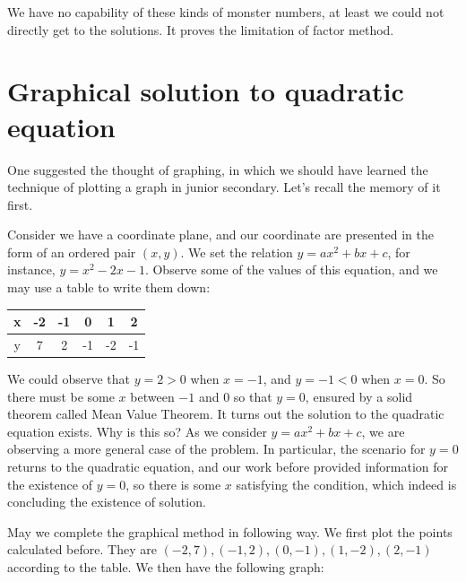 \documentclass[12pt]{article}
\begin{document}
    We have no capability of these kinds of monster numbers, at least we could not directly get to the solutions. It proves the limitation of factor method.

    \section*{Graphical solution to quadratic equation}
    One suggested the thought of graphing, in which we should have learned the technique of plotting a graph in junior secondary. Let's recall the memory of it first.

    Consider we have a coordinate plane, and our coordinate are presented in the form of an ordered pair $(x,y)$. We set the relation $y=ax^2+bx+c$, for instance, $y=x^2-2x-1$. Observe some of the values of this equation, and we may use a table to write them down:
    \begin{center}
        \begin{tabular}{|c||c|c|c|c|c|}
            \hline
            x&-2&-1&0&1&2\\
            \hline
            y&7&2&-1&-2&-1\\
            \hline
        \end{tabular}
    \end{center}

    We could observe that $y=2>0$ when $x=-1$, and $y=-1<0$ when $x=0$. So there must be some $x$ between $-1$ and $0$ so that $y=0$, ensured by a solid theorem called Mean Value Theorem. It turns out the solution to the quadratic equation exists. Why is this so? As we consider $y=ax^2+bx+c$, we are observing a more general case of the problem. In particular, the scenario for $y=0$ returns to the quadratic equation, and our work before provided information for the existence of $y=0$, so there is some $x$ satisfying the condition, which indeed is concluding the existence of solution.

    May we complete the graphical method in following way. We first plot the points calculated before. They are $(-2,7),(-1,2),(0,-1),(1,-2),(2,-1)$ according to the table. We then have the following graph:\\
    \begin{center}
    \end{center}
\end{document}
